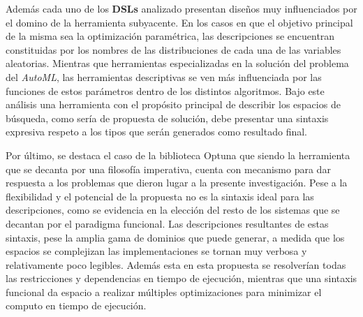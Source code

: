 Además cada uno de los {\bf DSLs} analizado presentan diseños muy influenciados
por el domino de la herramienta subyacente. En los casos en que el objetivo
principal de la misma sea la optimización paramétrica, las descripciones se
encuentran constituidas por los nombres de las distribuciones de cada una de
las variables aleatorias. Mientras que herramientas especializadas en la solución
del problema del {\it AutoML}, las herramientas descriptivas se ven más influenciada
por las funciones de estos parámetros dentro de los distintos algoritmos. Bajo este
análisis una herramienta con el propósito principal de describir los espacios de
búsqueda, como sería de propuesta de solución, debe presentar una sintaxis expresiva
respeto a los tipos que serán generados como resultado final.

Por último, se destaca el caso de la biblioteca Optuna que siendo la herramienta
que se decanta por una filosofía imperativa, cuenta con mecanismo para dar respuesta
a los problemas que dieron lugar a la presente investigación. Pese a la flexibilidad
y el potencial de la propuesta no es la sintaxis ideal para las descripciones, como se
evidencia en la elección del resto de los sistemas que se decantan por el paradigma
funcional. Las descripciones resultantes de estas sintaxis, pese la amplia gama de
dominios que puede generar, a medida que los espacios se complejizan las implementaciones
se tornan muy verbosa y relativamente poco legibles. Además esta en esta propuesta se
resolverían todas las restricciones y dependencias en tiempo de ejecución, mientras
que una sintaxis funcional da espacio a realizar múltiples optimizaciones para
minimizar el computo en tiempo de ejecución.
